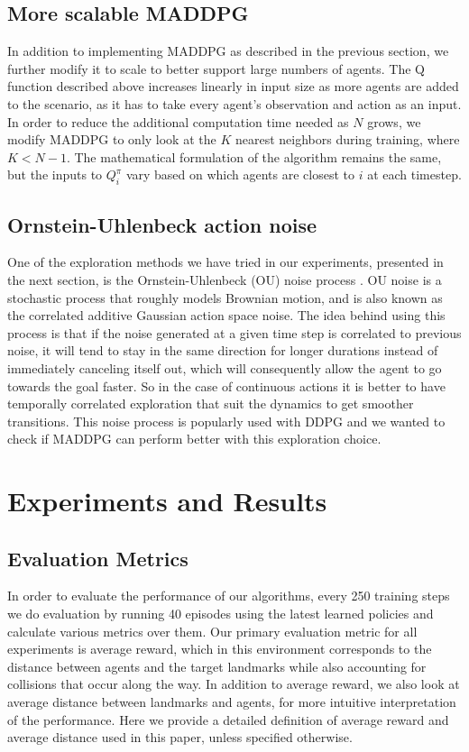 \documentclass{article}
\begin{document}
\subsection{More scalable MADDPG}
In addition to implementing MADDPG as described in the previous section, we further modify it to scale to better support large numbers of agents. The Q function described above increases linearly in input size as more agents are added to the scenario, as it has to take every agent's observation and action as an input. In order to reduce the additional computation time needed as $N$ grows, we modify MADDPG to only look at the $K$ nearest neighbors during training, where $K < N-1$. The mathematical formulation of the algorithm remains the same, but the inputs to $Q^\pi_i$ vary based on which agents are closest to $i$ at each timestep.

\subsection{Ornstein-Uhlenbeck action noise}
One of the exploration methods we have tried in our experiments, presented in the next section, is the Ornstein-Uhlenbeck (OU) noise process \cite{ou}. OU noise is a stochastic process that roughly models Brownian motion, and is also known as the correlated additive Gaussian action space noise. The idea behind using this process is that if the noise generated at a given time step is correlated to previous noise, it will tend to stay in the same direction for longer durations instead of immediately canceling itself out, which will consequently allow the agent to go towards the goal faster. So in the case of continuous actions it is better to have temporally correlated exploration that suit the dynamics to get smoother transitions. This noise process is popularly used with DDPG and we wanted to check if MADDPG can perform better with this exploration choice.

\section{Experiments and Results}
\subsection{Evaluation Metrics}

In order to evaluate the performance of our algorithms, every 250 training steps we do evaluation by running 40 episodes using the latest learned policies and calculate various metrics over them. Our primary evaluation metric for all experiments is average reward, which in this environment corresponds to the distance between agents and the target landmarks while also accounting for collisions that occur along the way. In addition to average reward, we also look at average distance between landmarks and agents, for more intuitive interpretation of the performance. Here we provide a detailed definition of average reward and average distance used in this paper, unless specified otherwise.
\end{document}
